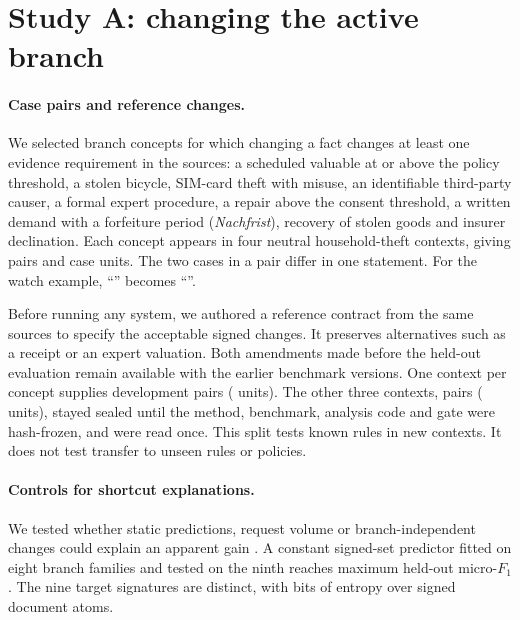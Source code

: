 \section{Study A: changing the active branch}
\label{sec:benchmark}

\paragraph{Case pairs and reference changes.}
We selected \nConcepts{} branch concepts for which changing a fact changes
at least one evidence requirement in the sources: a scheduled valuable at
or above the policy threshold, a stolen bicycle, SIM-card theft with misuse,
an identifiable third-party causer, a formal expert procedure, a repair
above the consent threshold, a written demand with a forfeiture period
(\emph{Nachfrist}), recovery of stolen goods and insurer declination.
Each concept appears in four neutral household-theft contexts, giving
\nPairsAll{} pairs and \nUnitsAll{} case units. The two cases in a pair
differ in one statement. For the watch example, ``\pairExampleFalse''
becomes ``\pairExampleTrue''.

Before running any system, we authored a reference contract from the same
sources to specify the acceptable signed changes. It preserves alternatives
such as a receipt or an expert valuation. Both amendments made before the
held-out evaluation remain available with the earlier benchmark versions.
One context per concept supplies \nPairsDev{} development pairs
(\nUnitsDev{} units). The other three contexts, \nPairsHid{} pairs
(\nUnitsHid{} units), stayed sealed until the method, benchmark, analysis
code and gate were hash-frozen, and were read once. This split tests known
rules in new contexts. It does not test transfer to unseen rules or policies.

\paragraph{Controls for shortcut explanations.}
We tested whether static predictions, request volume or branch-independent
changes could explain an apparent gain
\citep{kaushik2018reading,sugawara2018easier,mccoy2019hans,bowman2021benchmarking,yuan2024shortcut}.
A constant signed-set predictor fitted on eight branch families and tested
on the ninth reaches maximum held-out micro-$F_1$ \pfNoInputMax. The nine
target signatures are distinct, with \pfEntropy{} bits of entropy over
\pfUniverse{} signed document atoms.

